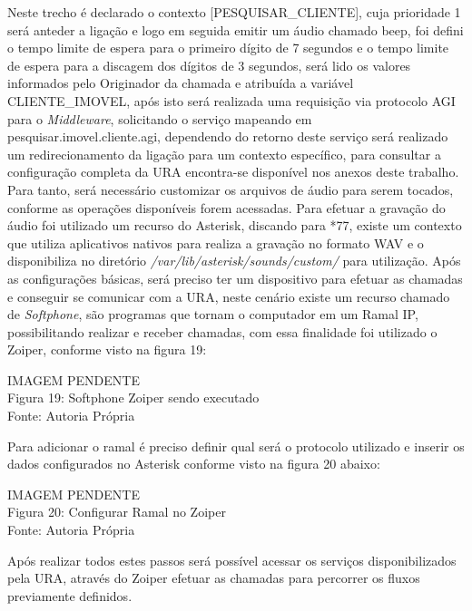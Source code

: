 Neste trecho é declarado o contexto [PESQUISAR\_CLIENTE], cuja prioridade 1 será anteder a ligação e logo em seguida emitir um áudio chamado beep, foi defini o tempo limite de espera para o primeiro dígito de 7 segundos e o tempo limite de espera para a discagem dos dígitos de 3 segundos, será lido os valores informados pelo Originador da chamada e atribuída a variável CLIENTE\_IMOVEL, após isto será realizada uma requisição via protocolo AGI para o \textit{Middleware}, solicitando o serviço mapeando em pesquisar.imovel.cliente.agi, dependendo do retorno deste serviço será realizado um redirecionamento da ligação para um contexto específico, para consultar a configuração completa da URA encontra-se disponível nos anexos deste trabalho.
Para tanto, será necessário customizar os arquivos de áudio para serem tocados, conforme as operações disponíveis forem acessadas. Para efetuar a gravação do áudio foi utilizado um recurso do Asterisk, discando para *77, existe um contexto que utiliza aplicativos nativos para realiza a gravação no formato WAV e o disponibiliza no diretório \textit{/var/lib/asterisk/sounds/custom/} para utilização.
Após as configurações básicas, será preciso ter um dispositivo para efetuar as chamadas e conseguir se comunicar com a URA, neste cenário existe um recurso chamado de \textit{Softphone}, são programas que tornam o computador em um Ramal IP, possibilitando realizar e receber chamadas, com essa finalidade foi utilizado o Zoiper, conforme visto na figura 19:

\begin{center}
	IMAGEM PENDENTE \\
	Figura 19: Softphone Zoiper sendo executado \\
	Fonte: Autoria Própria\\			
\end{center}

Para adicionar o ramal é preciso definir qual será o protocolo utilizado e inserir os dados configurados no Asterisk conforme visto na figura 20 abaixo:

\begin{center}
	IMAGEM PENDENTE \\
	Figura 20: Configurar Ramal no Zoiper \\
	Fonte: Autoria Própria\\				
\end{center}

Após realizar todos estes passos será possível acessar os serviços disponibilizados pela URA, através do Zoiper efetuar as chamadas para percorrer os fluxos previamente definidos.